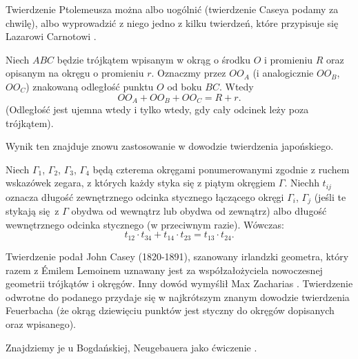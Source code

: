 Twierdzenie Ptolemeusza można albo uogólnić (twierdzenie Caseya podamy za chwilę), albo wyprowadzić z niego jedno z kilku twierdzeń, które przypisuje się Lazarowi Carnotowi \cite{carnot_1803}.

\begin{theorem}[Carnot, 1803?]
    Niech $ABC$ będzie trójkątem wpisanym w okrąg o środku $O$ i promieniu $R$ oraz opisanym na okręgu o promieniu $r$.
    Oznaczmy przez $OO_A$ (i analogicznie $OO_B$, $OO_C$) znakowaną odległość punktu $O$ od boku $BC$.
    Wtedy 
    \begin{equation}
        OO_A + OO_B + OO_C = R + r.
    \end{equation}
    (Odległość jest ujemna wtedy i tylko wtedy, gdy cały odcinek leży poza trójkątem).
\end{theorem}

Wynik ten znajduje znowu zastosowanie w dowodzie twierdzenia japońskiego. %


\begin{theorem}[Caseya, 1866]
%
    Niech $\Gamma_1$, $\Gamma_2$, $\Gamma_3$, $\Gamma_4$ będą czterema okręgami ponumerowanymi zgodnie z ruchem wskazówek zegara, z których każdy styka się z piątym okręgiem $\Gamma$.
    Niechh $t_{ij}$ oznacza długość zewnętrznego odcinka stycznego łączącego okręgi $\Gamma_i$, $\Gamma_j$ (jeśli te stykają się z $\Gamma$ obydwa od wewnątrz lub obydwa od zewnątrz) albo długość wewnętrznego odcinka stycznego (w przeciwnym razie).
    Wówczas:
    \begin{equation}
        t_{12} \cdot t_{34} + t_{14} \cdot t_{23} = t_{13} \cdot t_{24}.
    \end{equation}
\end{theorem}

Twierdzenie podał John Casey (1820-1891), szanowany irlandzki geometra, który razem z Émilem Lemoinem uznawany jest za współzałożyciela nowoczesnej geometrii trójkątów i okręgów.
%
Inny dowód wymyślił Max Zacharias \cite{zacharias_1942}.
%
Twierdzenie odwrotne do podanego przydaje się w najkrótszym znanym dowodzie twierdzenia Feuerbacha (że okrąg dziewięciu punktów jest styczny do okręgów dopisanych oraz wpisanego).
%
%
%
%

Znajdziemy je u Bogdańskiej, Neugebauera jako ćwiczenie \cite[s. 105]{neugebauer_2018}.

%